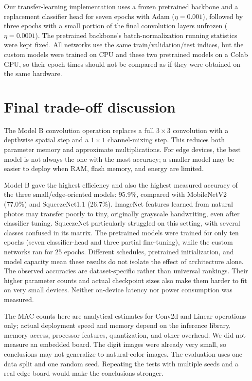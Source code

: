 \documentclass[11pt,a4paper]{article}
\begin{document}
Our transfer-learning implementation uses a frozen pretrained backbone and a replacement classifier head for seven epochs with Adam ($\eta=0.001$), followed by three epochs with a small portion of the final convolution layers unfrozen ($\eta=0.0001$). The pretrained backbone's batch-normalization running statistics were kept fixed. All networks use the same train/validation/test indices, but the custom models were trained on CPU and these two pretrained models on a Colab GPU, so their epoch times should not be compared as if they were obtained on the same hardware.

\section{Final trade-off discussion}
The Model B convolution operation replaces a full $3\times3$ convolution with a depthwise spatial step and a $1\times1$ channel-mixing step. This reduces both parameter memory and approximate multiplications. For edge devices, the best model is not always the one with the most accuracy; a smaller model may be easier to deploy when RAM, flash memory, and energy are limited.

Model B gave the highest efficiency and also the highest measured accuracy of the three small/edge-oriented models: 95.9\%, compared with MobileNetV2 (77.0\%) and SqueezeNet1.1 (26.7\%). ImageNet features learned from natural photos may transfer poorly to tiny, originally grayscale handwriting, even after classifier tuning. SqueezeNet particularly struggled on this setting, with several classes confused in its matrix. The pretrained models were trained for only ten epochs (seven classifier-head and three partial fine-tuning), while the custom networks ran for 25 epochs. Different schedules, pretrained initialization, and model capacity mean these results do not isolate the effect of architecture alone. The observed accuracies are dataset-specific rather than universal rankings. Their higher parameter counts and actual checkpoint sizes also make them harder to fit on very small devices. Neither on-device latency nor power consumption was measured.

The MAC counts here are analytical estimates for Conv2d and Linear operations only; actual deployment speed and memory depend on the inference library, memory access, processor features, quantization, and other overhead. We did not measure an embedded board. The digit images were already very small, so conclusions may not generalize to natural-color images. The evaluation uses one data split and one random seed. Repeating the tests with multiple seeds and a real edge board would make the conclusions stronger.
\end{document}
